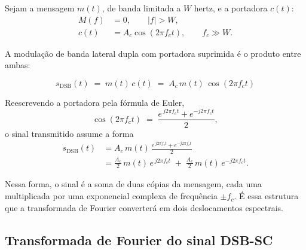 \documentclass[11pt,a4paper]{article}
\newcommand{\DSB}{\text{DSB}}
\begin{document}
Sejam a mensagem $m(t)$, de banda limitada a $W$ hertz, e a portadora $c(t)$:
\begin{align}
  M(f) &= 0, \qquad |f| > W, \label{eq:banda_limitada}\\[0.2em]
  c(t) &= A_c\cos(2\pi f_c t), \qquad f_c \gg W. \label{eq:portadora}
\end{align}

A modulação de banda lateral dupla com portadora suprimida é o produto entre ambas:

\begin{quadro}
\[
  \boxed{\;s_{\DSB}(t) \;=\; m(t)\,c(t) \;=\; A_c\, m(t)\,\cos(2\pi f_c t)\;}
\]
\end{quadro}

Reescrevendo a portadora pela fórmula de Euler,
\begin{equation}
  \cos(2\pi f_c t) \;=\; \frac{e^{\,j2\pi f_c t} + e^{-j2\pi f_c t}}{2},
  \label{eq:euler}
\end{equation}
o sinal transmitido assume a forma
\begin{align}
  s_{\DSB}(t)
  &= A_c\, m(t)\,\frac{e^{\,j2\pi f_c t} + e^{-j2\pi f_c t}}{2} \nonumber\\[0.3em]
  &= \frac{A_c}{2}\, m(t)\, e^{\,j2\pi f_c t} \;+\; \frac{A_c}{2}\, m(t)\, e^{-j2\pi f_c t}.
  \label{eq:dsbsc_euler}
\end{align}

Nessa forma, o sinal é a soma de duas cópias da mensagem, cada uma multiplicada por uma exponencial complexa de frequência $\pm f_c$. É essa estrutura que a transformada de Fourier converterá em dois deslocamentos espectrais.

\subsection{Transformada de Fourier do sinal DSB-SC}
\end{document}
